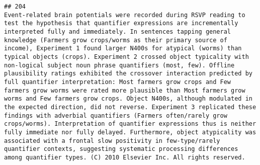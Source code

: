 \documentclass[
  english,
  man]{apa6}
\begin{document}
\begin{verbatim}
## 204                                                                                                                                                                                                                                                                                                                                                                                                                                                                                                                                                                                                                                                                                                                                                                                                                                                                                                                                                                                                                                                                                                                                                                                                                                                                                                                                                                                                                     Event-related brain potentials were recorded during RSVP reading to test the hypothesis that quantifier expressions are incrementally interpreted fully and immediately. In sentences tapping general knowledge (Farmers grow crops/worms as their primary source of income), Experiment 1 found larger N400s for atypical (worms) than typical objects (crops). Experiment 2 crossed object typicality with non-logical subject noun phrase quantifiers (most, few). Offline plausibility ratings exhibited the crossover interaction predicted by full quantifier interpretation: Most farmers grow crops and Few farmers grow worms were rated more plausible than Most farmers grow worms and Few farmers grow crops. Object N400s, although modulated in the expected direction, did not reverse. Experiment 3 replicated these findings with adverbial quantifiers (Farmers often/rarely grow crops/worms). Interpretation of quantifier expressions thus is neither fully immediate nor fully delayed. Furthermore, object atypicality was associated with a frontal slow positivity in few-type/rarely quantifier contexts, suggesting systematic processing differences among quantifier types. (C) 2010 Elsevier Inc. All rights reserved.

\end{verbatim}
\end{document}
